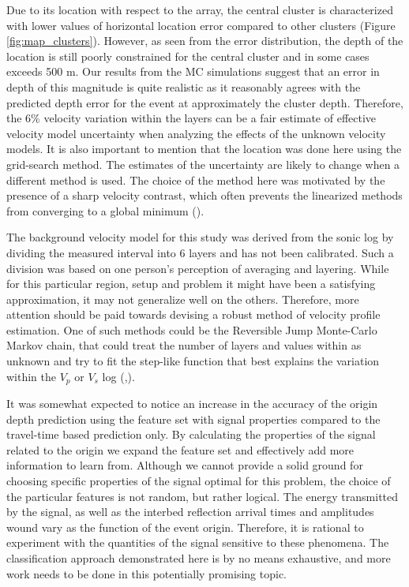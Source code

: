 Due to its location with respect to the array, the central cluster is characterized with lower values of horizontal location error compared to other clusters (Figure \ref{fig:map_clusters}). However, as seen from the error distribution, the depth of the location is still poorly constrained for the central cluster and in some cases exceeds 500 m. Our results from the MC simulations suggest that an error in depth of this magnitude is quite realistic as it reasonably agrees with the predicted depth error for the event at approximately the cluster depth. Therefore, the 6\% velocity variation within the layers can be a fair estimate of effective velocity model uncertainty when analyzing the effects of the unknown velocity models.
It is also important to mention that the location was done here using the grid-search method. The estimates of the uncertainty are likely to change when a different method is used. The choice of the method here was motivated by the presence of a sharp velocity contrast, which often prevents the linearized methods from converging to a global minimum (\cite{lomax_earthquake_2009}).  


The background velocity model for this study was derived from the sonic log by dividing the measured interval into 6 layers and has not been calibrated. Such a division was based on one person's perception of averaging and layering. While for this particular region, setup and problem it might have been a satisfying approximation, it may not generalize well on the others. Therefore, more attention should be paid towards devising a robust method of velocity profile estimation. One of such methods could be the Reversible Jump Monte-Carlo Markov chain, that could treat the number of layers and values within as unknown and try to fit the step-like function that best explains the variation within the $V_{p}$ or $V_{s}$ log (\cite{sambridge_monte_2002},\cite{bodin_seismic_2009}).


It was somewhat expected to notice an increase in the accuracy of the origin depth prediction using the feature set with signal properties compared to the travel-time based prediction only. By calculating the properties of the signal related to the origin we expand the feature set and effectively add more information to learn from. Although we cannot provide a solid ground for choosing specific properties of the signal optimal for this problem, the choice of the particular features is not random, but rather logical. The energy transmitted by the signal, as well as the interbed reflection arrival times and amplitudes wound vary as the function of the event origin. Therefore, it is rational to experiment with the quantities of the signal sensitive to these phenomena. The classification approach demonstrated here is by no means exhaustive, and more work needs to be done in this potentially promising topic.


